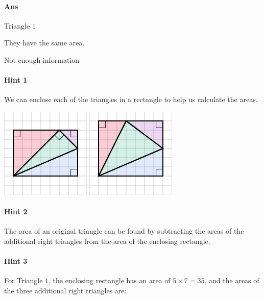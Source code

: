 \documentclass[twocolumn,10pt]{article}
\def\shrinkfactor{0.55}
\begin{document}
\paragraph{Ans} 

Triangle $1$


 They have the same area.

Not enough information



\paragraph{Hint 1}We can enclose each of the triangles in a rectangle to help us calculate the areas.  

\includegraphics[scale=\shrinkfactor]{figures/007ce6e3f8950260d7c441f0203fe8adf5d08f91.png} 
\includegraphics[scale=\shrinkfactor]{figures/e493003dc024741cbf270d5909c891c9e151ebaf.png}

\paragraph{Hint 2}The area of an original triangle can be found by subtracting the areas of the additional right triangles from the area of the enclosing rectangle.  

\paragraph{Hint 3}For Triangle $1$, the enclosing rectangle has an area of $5 \times 7 = 35$, and the areas of the three additional right triangles are:  
\end{document}
